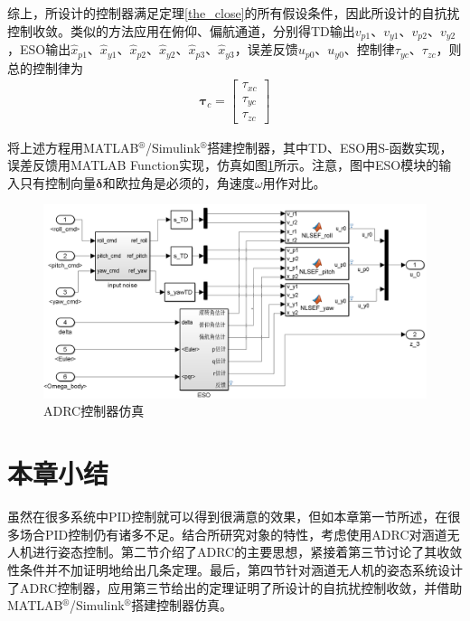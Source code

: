 综上，所设计的控制器满足定理\ref{the_close}的所有假设条件，因此所设计的自抗扰控制收敛。类似的方法应用在俯仰、偏航通道，分别得TD输出$ v_{p1} $、$ v_{y1} $、$ v_{p2} $、$ v_{y2} $，ESO输出$ \hat{x}_{p1} $、$ \hat{x}_{y1} $、$ \hat{x}_{p2} $、$ \hat{x}_{y2} $、$ \hat{x}_{p3} $、$  \hat{x}_{y3}  $，误差反馈$ u_{p0} $、$ u_{y0} $、控制律$\tau_{yc}$、$\tau_{zc}$，则总的控制律为
\begin{align}
\bm{\tau}_c =  \begin{bmatrix}
\tau_{x c} \\
\tau_{y c} \\
\tau_{z c}
\end{bmatrix}	\label{eq_attitude_cpntrol_law}
\end{align}

将上述方程用MATLAB$^\circledR$/Simulink$^\circledR$搭建控制器，其中TD、ESO用S-函数实现，误差反馈用MATLAB Function实现，仿真如图\ref{fig_controller_simulink}所示。注意，图中ESO模块的输入只有控制向量$ \bm{\delta} $和欧拉角是必须的，角速度$ \omega $用作对比。
\begin{figure}[htbp]
	\centering
	\includegraphics[scale=0.36]{Fig/Fig_Controller.png}
	\caption{\label{fig_controller_simulink}ADRC控制器仿真}
\end{figure}
\section{本章小结}
虽然在很多系统中PID控制就可以得到很满意的效果，但如本章第一节所述，在很多场合PID控制仍有诸多不足。结合所研究对象的特性，考虑使用ADRC对涵道无人机进行姿态控制。第二节介绍了ADRC的主要思想，紧接着第三节讨论了其收敛性条件并不加证明地给出几条定理。最后，第四节针对涵道无人机的姿态系统设计了ADRC控制器，应用第三节给出的定理证明了所设计的自抗扰控制收敛，并借助MATLAB$^\circledR$/Simulink$^\circledR$搭建控制器仿真。








